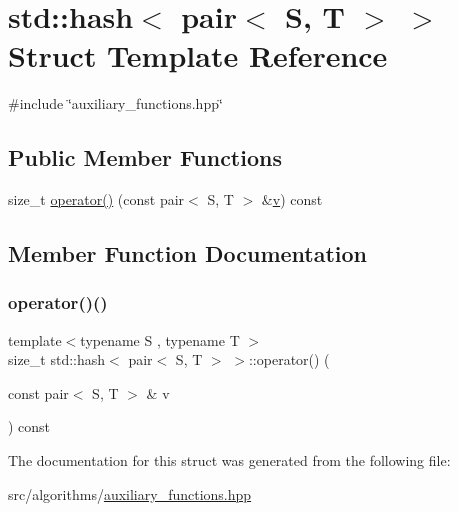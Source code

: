 \hypertarget{structstd_1_1hash_3_01pair_3_01S_00_01T_01_4_01_4}{}\section{std\+:\+:hash$<$ pair$<$ S, T $>$ $>$ Struct Template Reference}
\label{structstd_1_1hash_3_01pair_3_01S_00_01T_01_4_01_4}


{\ttfamily \#include \char`\"{}auxiliary\+\_\+functions.\+hpp\char`\"{}}

\subsection*{Public Member Functions}
\begin{DoxyCompactItemize}
\item 
size\+\_\+t \mbox{\hyperlink{structstd_1_1hash_3_01pair_3_01S_00_01T_01_4_01_4_a6fec6cb26e96fb20d4ec121487e5acb4}{operator()}} (const pair$<$ S, T $>$ \&\mbox{\hyperlink{glad_8h_a30522dbcc3e66083fcf2bf64d1fad76a}{v}}) const
\end{DoxyCompactItemize}


\subsection{Member Function Documentation}
\mbox{\label{structstd_1_1hash_3_01pair_3_01S_00_01T_01_4_01_4_a6fec6cb26e96fb20d4ec121487e5acb4}} 
\subsubsection{\texorpdfstring{operator()()}{operator()()}}
{\footnotesize\ttfamily template$<$typename S , typename T $>$ \\
size\+\_\+t std\+::hash$<$ pair$<$ S, T $>$ $>$\+::operator() (\begin{DoxyParamCaption}\item[{const pair$<$ S, T $>$ \&}]{v }\end{DoxyParamCaption}) const\hspace{0.3cm}{\ttfamily [inline]}}



The documentation for this struct was generated from the following file\+:\begin{DoxyCompactItemize}
\item 
src/algorithms/\mbox{\hyperlink{auxiliary__functions_8hpp}{auxiliary\+\_\+functions.\+hpp}}\end{DoxyCompactItemize}
